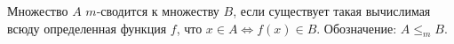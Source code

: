 Множество $A$ $m$-сводится к множеству $B$, если существует такая вычислимая всюду определенная функция
$f$, что  $x \in A \Leftrightarrow f(x) \in B$. Обозначение: $A \le_m B$.